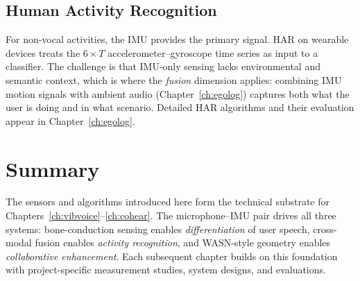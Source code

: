 \subsection{Human Activity Recognition}

For non-vocal activities, the IMU provides the primary signal. HAR on wearable devices treats the $6 \times T$ accelerometer--gyroscope time series as input to a classifier. The challenge is that IMU-only sensing lacks environmental and semantic context, which is where the \textit{fusion} dimension applies: combining IMU motion signals with ambient audio (Chapter~\ref{ch:egolog}) captures both what the user is doing and in what scenario. Detailed HAR algorithms and their evaluation appear in Chapter~\ref{ch:egolog}.

\section{Summary}

The sensors and algorithms introduced here form the technical substrate for Chapters~\ref{ch:vibvoice}--\ref{ch:cohear}. The microphone--IMU pair drives all three systems: bone-conduction sensing enables \textit{differentiation} of user speech, cross-modal fusion enables \textit{activity recognition}, and WASN-style geometry enables \textit{collaborative enhancement}. Each subsequent chapter builds on this foundation with project-specific measurement studies, system designs, and evaluations.
